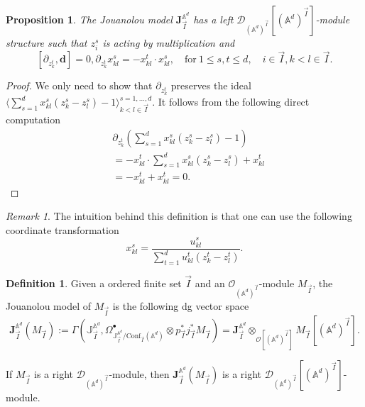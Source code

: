 \documentclass[11pt]{amsart}
\newtheorem{prop}[thm]{Proposition}
\theoremstyle{definition}
\newtheorem{defn}[thm]{Definition}
\theoremstyle{remark}
\newtheorem{rem}[thm]{Remark}
\numberwithin{equation}{section}
\begin{document}
\begin{prop}
    The Jouanolou model $\mathbf{J}^{\mathbb{A}^d}_{\vec{I}}$ has a left $\mathcal{D}_{(\mathbb{A}^d)^{\vec{I}}}[(\mathbb{A}^d)^{\vec{I}}]$-module structure such that $z^s_i$ is acting by multiplication and
    $$
   [\partial_{z^t_k},\mathbf{d}]=0, \partial_{z^t_k}x^s_{kl}=-x^t_{kl}\cdot x^s_{kl}, \quad \text{for}\  1\leq s,t\leq d,\quad i\in \vec{I},k<l\in \vec{I}.
    $$

\end{prop}
\begin{proof}
We only need to show that $\partial_{z^t_k}$ preserves the ideal $\langle \sum\limits_{s=1}^dx^s_{kl}(z^s_k-z^s_l)-1\rangle^{s=1,\dots,d}_{k<l\in \vec{I}}$. It follows from the following direct computation
\begin{align*}
   & \partial_{z^t_k} \left(\sum\limits_{s=1}^dx^s_{kl}(z^s_k-z^s_l)-1\right)\\
   & =-x^t_{kl}\cdot\sum\limits_{s=1}^dx^s_{kl}(z^s_k-z^s_l)+x^t_{kl}\\
   &=-x^t_{kl}+x^t_{kl}=0.
\end{align*}

\end{proof}
\begin{rem}
    The intuition behind this definition is that one can use the following coordinate transformation
    $$
    x^s_{kl}=\frac{u^s_{kl}}{\sum\limits^d_{t=1}u^t_{kl}(z^t_k-z^t_l)}.
    $$
\end{rem}


\begin{defn}
Given a ordered finite set $\vec{I}$ and an $\mathcal{O}_{(\mathbb{A}^d)^{\vec{I}}}$-module $M_{\vec{I}}$, the Jouanolou model of $M_{\vec{I}}$ is the following dg vector space
$$
\mathbf{J}^{\mathbb{A}^d}_{\vec{I}}(M_{\vec{I}}):=\Gamma\left(\mathbb{J}^{\mathbb{A}^d}_{\vec{I}},\Omega^{\bullet}_{\mathbb{J}^{\mathbb{A}^d}_{\vec{I}}/\mathrm{Conf}_{\vec{I}}(\mathbb{A}^d)}\otimes p^*_{\vec{I}}j^*_{\vec{I}}M_{\vec{I}} \right)=\mathbf{J}^{\mathbb{A}^d}_{\vec{I}}\otimes_{\mathcal{O}[(\mathbb{A}^d)^{\vec{I}}]}M_{\vec{I}}[(\mathbb{A}^d)^{\vec{I}}].
$$

If $M_{\vec{I}}$ is a right $\mathcal{D}_{(\mathbb{A}^d)^{\vec{I}}}$-module, then $\mathbf{J}^{\mathbb{A}^d}_{\vec{I}}(M_{\vec{I}})$ is a right $\mathcal{D}_{(\mathbb{A}^d)^{\vec{I}}}[(\mathbb{A}^d)^{\vec{I}}]$-module.
\end{defn}
\end{document}
